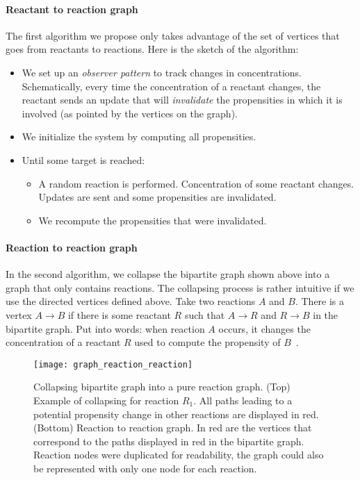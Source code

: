 \paragraph{Reactant to reaction graph}

The first algorithm we propose only takes advantage of the set of vertices that goes from reactants to reactions. Here is the sketch of the algorithm:
\begin{itemize}
  \item We set up an \emph{observer pattern} to track changes in concentrations. Schematically, every time the concentration of a reactant changes, the reactant sends an update that will \emph{invalidate} the propensities in which it is involved (as pointed by the vertices on the graph).
  \item We initialize the system by computing all propensities.
  \item Until some target is reached:
    \begin{itemize}
      \item A random reaction is performed. Concentration of some reactant changes. Updates are sent and some propensities are invalidated.
      \item We recompute the propensities that were invalidated.
    \end{itemize}
\end{itemize}

\paragraph{Reaction to reaction graph}

In the second algorithm, we collapse the bipartite graph shown above into a graph that only contains reactions. The collapsing process is rather intuitive if we use the directed vertices defined above. Take two reactions $A$ and $B$. There is a vertex $A \rightarrow B$ if there is some reactant $R$ such that $A \rightarrow R$ and $R \rightarrow B$ in the bipartite graph. Put into words: when reaction $A$ occurs, it changes the concentration of a reactant $R$ used to compute the propensity of $B$~.

\begin{figure}[!ht]
  \centering
  \texttt{[image: graph\_reaction\_reaction]}
  \caption{Collapsing bipartite graph into a pure reaction graph. (Top) Example of collapsing for reaction $R_1$. All paths leading to a potential propensity change in other reactions are displayed in red. (Bottom) Reaction to reaction graph. In red are the vertices that correspond to the paths displayed in red in the bipartite graph. Reaction nodes were duplicated for readability, the graph could also be represented with only one node for each reaction.}
  \label{fig:reaction_reaction_graph}
\end{figure}

